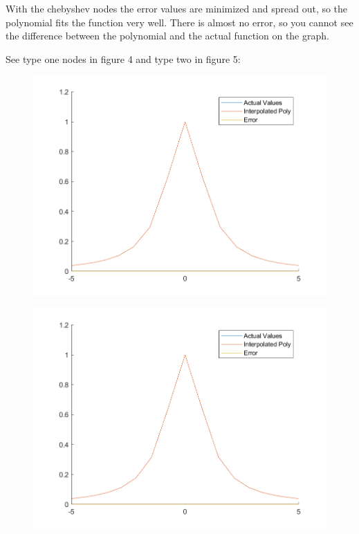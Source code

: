 \documentclass[]{article}
\begin{document}
With the chebyshev nodes the error values are minimized and spread out,
so the polynomial fits the function very well. There is almost no error,
so you cannot see the difference between the polynomial and the actual
function on the graph.

See type one nodes in figure 4 and type two in figure 5:

\begin{figure}
\centering
\includegraphics{./Media/type1Cheby.png}
\caption{}
\end{figure}

\begin{figure}
\centering
\includegraphics{./Media/type2Cheby.png}
\caption{}
\end{figure}
\end{document}
